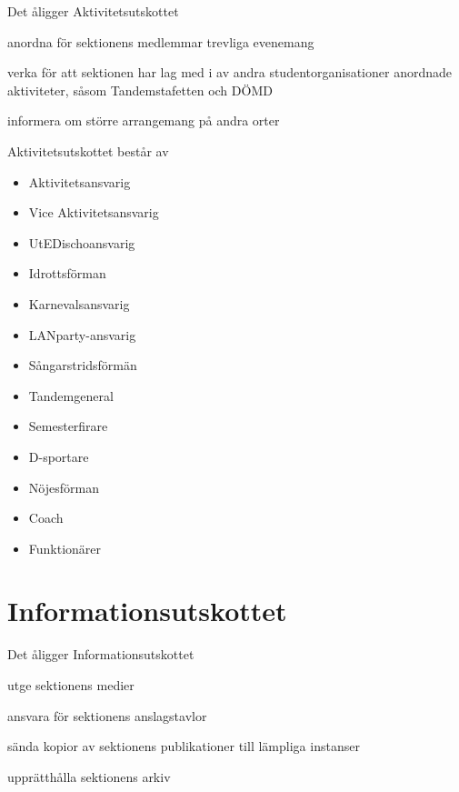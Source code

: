 \documentclass[pdfbookmarks,a4paper,11pt]{article}
\newlength{\itemcollength}
\newenvironment{reglemlista}{%
  \begin{list}{}{%
      \setlength{\labelwidth}{\itemcollength}%
      \setlength{\leftmargin}{\labelwidth + \labelsep}%
      \renewcommand{\makelabel}[1]{%
        \raisebox{0pt}[1ex][0pt]{%
          \makebox[\labelwidth][l]{%
            \parbox[t]{\itemcollength}{%
              \raggedright\hspace{0pt}##1}}}\hfill}%
      }}{%
  \end{list}}
\begin{document}
\begin{reglemlista}

	\item[Åligganden]
	Det åligger Aktivitetsutskottet
	\begin{attlista}
		\item anordna för sektionens medlemmar trevliga evenemang
		\item verka för att sektionen har lag med i av andra studentorganisationer anordnade aktiviteter, såsom Tandemstafetten och DÖMD
		\item informera om större arrangemang på andra orter
	\end{attlista}

	\item[Sammansättning]
	Aktivitetsutskottet består av
	\begin{itemize}
		\item Aktivitetsansvarig
		\item Vice Aktivitetsansvarig
		\item UtEDischoansvarig
		\item Idrottsförman
		\item Karnevalsansvarig
		\item LANparty-ansvarig
		\item Sångarstridsförmän
		\item Tandemgeneral
		\item Semesterfirare
		\item D-sportare
		\item Nöjesförman
		\item Coach
		\item Funktionärer
	\end{itemize}


\section{Informationsutskottet}

\begin{reglemlista}

	\item[Åligganden]
	Det åligger Informationsutskottet
	\begin{attlista}
		\item utge sektionens medier
		\item ansvara för sektionens anslagstavlor
		\item sända kopior av sektionens publikationer till lämpliga instanser
		\item upprätthålla sektionens arkiv
	\end{attlista}


\end{reglemlista}
\end{reglemlista}
\end{document}
